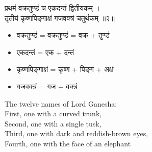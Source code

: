 \documentclass{book}
\newenvironment{Verse}[1][]
  {\bigskip\noindent\begin{center}\begin{adjustbox}{valign=M}\begin{tcolorbox}[colframe=black,colback=white,boxrule=0.5mm,arc=4mm,auto outer arc,left=2mm,right=2mm,top=2mm,bottom=2mm,halign=center]
  \LARGE\bfseries#1\par\varwidth{\linewidth}\centering}
  {\endvarwidth\end{tcolorbox}\end{adjustbox}\end{center}\bigskip}
\begin{document}
\begin{Verse}
    प्रथमं वक्रतुण्डं च एकदन्तं द्वितीयकम् ।\\
    तृतीयं कृष्णपिङ्गाक्षं गजवक्त्रं चतुर्थकम् ॥२॥
\end{Verse}


\begin{multicols}{2}
    \setlength{\columnseprule}{0.4pt}
    \begin{itemize}
        \item वक्रतुण्डं = वक्रतुण्डं = वक्र + तुण्डं
        \item एकदन्तं = एक + दन्तं
        \item कृष्णपिङ्गाक्षं = कृष्ण + पिङ्ग + अक्षं
        \item गजवक्त्रं = गज + वक्त्रं
    \end{itemize}

    \columnbreak
    
    \vspace{10pt}
    \textenglish{
        \noindent The twelve names of Lord Ganesha:\\
        First, one with a curved trunk,\\
        Second, one with a single tusk,\\
        Third, one with dark and reddish-brown eyes,\\
        Fourth, one with the face of an elephant
    }

\end{multicols}
\end{document}
